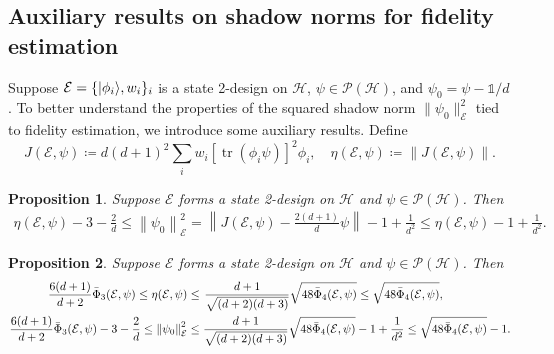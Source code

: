 \documentclass[aps,pra,twocolumn,nofootinbib,superscriptaddress,10pt]{revtex4-2}
\newtheorem{proposition}{Proposition}
\DeclarePairedDelimiter{\ket}{\lvert}{\rangle}
\DeclareMathOperator{\tr}{tr}
\newcommand{\lsp}{\mkern 2mu}           %
\newcommand{\bbone}{\mathds{1}}
\newcommand{\caE}{\mathcal{E}}
\newcommand{\caH}{\mathcal{H}}
\newcommand{\caP}{\mathcal{P}}
\newcommand{\bPhi}{\bar{\Phi}}
\begin{document}
\subsection{Auxiliary results on shadow norms for fidelity estimation}\label{app:FidEaux}
Suppose $\caE=\{\ket{\phi_i},w_i\}_i$ is a state 2-design on $\caH$, $\psi \in \caP(\caH)$, and $\psi_0=\psi-{\bbone}/{d}$. To better understand the properties of the squared shadow norm $\|\psi_0\|_\caE^2$ tied to fidelity estimation, we introduce some auxiliary results. Define
\begin{equation} J(\caE,\psi)\coloneqq d(d + 1)^2\sum_iw_i\left[\tr\left(\phi_i\psi\right)\right]^2\phi_{i},\quad \eta(\caE,\psi)\coloneqq\left\|J(\caE,\psi)\right\|.  \label{eq:JN}
\end{equation}

\begin{proposition}
\label{pro:w}
     Suppose $\caE$ forms a state 2-design on $\caH$ and $\psi\in\caP(\caH)$. Then
\begin{align}
   \eta(\caE,\psi)-3-\frac{2}{d}\le\left\|\psi_0\right\|_\caE^2=\left\|J(\caE,\psi)-\frac{2(d+1)}{d}\psi\right\|-1+\frac{1}{d^2}\le \eta(\caE,\psi)-1+\frac{1}{d^2}.\label{eq:w}
\end{align}
\end{proposition}

\begin{proposition}
\label{pro:concentration_fidelity}
    Suppose $\caE$ forms a state 2-design on $\caH$ and $\psi \in \caP(\caH)$. Then
    \begin{align}
   \dfrac{6(d+1)}{d+2}\bPhi_3(\caE,\psi)\leq      \eta(\caE,\psi)&\le \lsp \dfrac{d+1}{\sqrt{(d+2)(d+3)}}\sqrt{48\bPhi_4(\caE,\psi)}\leq \sqrt{48\bPhi_4(\caE,\psi)},\label{eq:QnormLUB}\\
         \dfrac{6(d+1)}{d+2}\bPhi_3(\caE,\psi)-3-\frac{2}{d}\leq \left\|\psi_0\right\|_\caE^2&\le \dfrac{d+1}{\sqrt{(d+2)(d+3)}}\sqrt{48\bPhi_4(\caE,\psi)}-1+\frac{1}{d^2}\leq \sqrt{48\bPhi_4(\caE,\psi)}-1.\label{eq:EpsiShNormLUB}
    \end{align}
\end{proposition}
\end{document}
